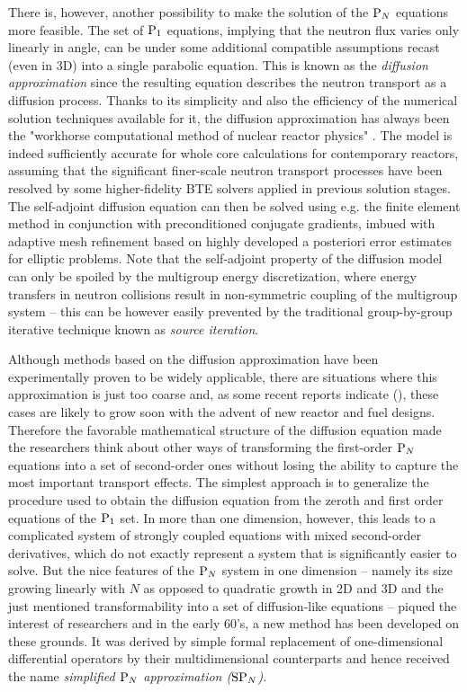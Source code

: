 There is, however, another possibility to make the solution of the $\PN$ equations more feasible. The set of $\PN[1]$ equations, implying that the neutron flux varies only linearly in angle, can be under some additional compatible assumptions recast (even in 3D) into a single parabolic equation. This is known as the \textit{diffusion approximation} since the resulting equation describes the neutron transport as a diffusion process. Thanks to its simplicity and also the efficiency of the numerical solution techniques available for it, the diffusion approximation has always been the "workhorse computational method of nuclear reactor
physics" \cite[p. 43]{Stacey1}. The model is indeed sufficiently accurate for whole core calculations for contemporary reactors, assuming that the significant finer-scale neutron transport processes have been resolved by some higher-fidelity BTE solvers applied in previous solution stages. The self-adjoint diffusion equation can then be solved using e.g. the finite element method in conjunction with preconditioned conjugate gradients, imbued with adaptive mesh refinement based on highly developed a posteriori error estimates for elliptic problems. Note that the self-adjoint property of the diffusion model can only be spoiled by the multigroup energy discretization, where energy transfers in neutron collisions result in non-symmetric coupling of the multigroup system -- this can be however easily prevented by the traditional group-by-group iterative technique known as \textit{source iteration}.

Although methods based on the diffusion approximation have been experimentally proven to be widely applicable, there are situations where this approximation is just too coarse and, as some recent reports indicate (\cite{Hejzlar1,Cho1}), these cases are likely to grow soon with the advent of new reactor and fuel designs. Therefore the favorable mathematical structure of the diffusion equation made the researchers think about other ways of transforming the first-order $\PN$ equations into a set of second-order ones without losing the ability to capture the most important transport effects. The simplest approach is to generalize the procedure used to obtain the diffusion equation from the zeroth and first order equations of the $\PN[1]$ set. In more than one dimension, however, this leads to a complicated system of strongly coupled equations with mixed second-order derivatives, which do not exactly represent a system that is significantly easier to solve. But the nice features of the $\PN$ system in one dimension -- namely its size growing linearly with $N$ as opposed to quadratic growth in 2D and 3D and the just mentioned transformability into a set of diffusion-like equations -- piqued the interest of researchers and in the early 60's, a new method has been developed on these grounds. It was derived by simple formal replacement of one-dimensional differential operators by their multidimensional counterparts and hence received the name \textit{simplified $\PN$ approximation ($\SPN$)}.

